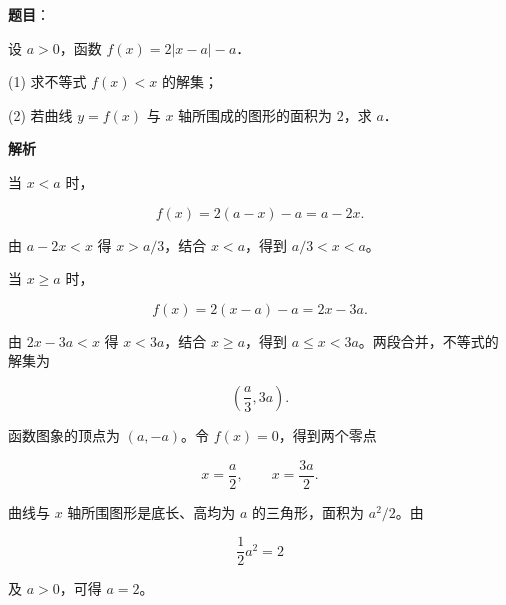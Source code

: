 \begin{answer}

\textbf{题目}：

设 $a>0$，函数 $f(x)=2|x-a|-a$．

  (1) 求不等式 $f(x)<x$ 的解集；

  (2) 若曲线 $y=f(x)$ 与 $x$ 轴所围成的图形的面积为 $2$，求 $a$．

\textbf{解析}


当 $x<a$ 时，

\nopagebreak[4]
\[
f(x)=2(a-x)-a=a-2x.
\]

由 $a-2x<x$ 得 $x>a/3$，结合 $x<a$，得到 $a/3<x<a$。

当 $x\geqslant a$ 时，

\nopagebreak[4]
\[
f(x)=2(x-a)-a=2x-3a.
\]

由 $2x-3a<x$ 得 $x<3a$，结合 $x\geqslant a$，得到 $a\leqslant x<3a$。两段合并，不等式的解集为

\nopagebreak[4]
\[
\left(\frac a3,3a\right).
\]


函数图象的顶点为 $(a,-a)$。令 $f(x)=0$，得到两个零点

\nopagebreak[4]
\[
x=\frac a2,\qquad x=\frac{3a}{2}.
\]

曲线与 $x$ 轴所围图形是底长、高均为 $a$ 的三角形，面积为 $a^2/2$。由

\nopagebreak[4]
\[
\frac12a^2=2
\]

及 $a>0$，可得 $a=2$。



\end{answer}